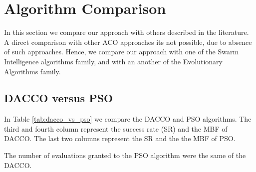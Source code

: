 	\section{Algorithm Comparison}
	In this section we compare our approach with others described in the literature. A direct comparison with other ACO approaches its not possible, due to absence of such approaches. Hence, we compare our approach with one of the Swarm Intelligence algorithms family, and with an another of the Evolutionary Algorithms family.
	
	\subsection{DACCO versus PSO}
	In Table \ref{tab:dacco_vs_pso} we compare the DACCO and PSO algorithms. The third and fourth column represent the success rate (SR) and the MBF of DACCO. The last two columns represent the SR and the the MBF of PSO. 
	
	The number of evaluations granted to the PSO algorithm were the same of the DACCO. 
	
